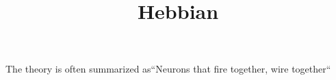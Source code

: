 \documentclass[a4paper]{article}
\title{Hebbian}
\date{}
\begin{document}
\maketitle
    
     The theory is often summarized as``Neurons that fire together, wire together``
\end{document}
